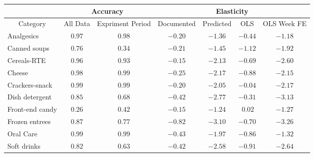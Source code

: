 {\small
\begin{center}
\begin{tabular}{l|cc|cccc}
\hline\hline
\multicolumn{1}{c|}{}&\multicolumn{2}{c|}{Accuracy}&\multicolumn{4}{c}{Elasticity}\tabularnewline
\hline
\multicolumn{1}{c}{Category}&\multicolumn{1}{c}{All Data}&\multicolumn{1}{c}{Expriment Period}&\multicolumn{1}{c}{Documented}&\multicolumn{1}{c}{Predicted}&\multicolumn{1}{c}{OLS}&\multicolumn{1}{c}{OLS Week FE}\tabularnewline
\hline
Analgesics&$0.97$&$0.98$&$-0.20$&$-1.36$&$-0.44$&$-1.18$\tabularnewline
Canned soups&$0.76$&$0.34$&$-0.21$&$-1.45$&$-1.12$&$-1.92$\tabularnewline
Cereals-RTE&$0.96$&$0.93$&$-0.15$&$-2.13$&$-0.69$&$-2.60$\tabularnewline
Cheese&$0.98$&$0.99$&$-0.25$&$-2.17$&$-0.88$&$-2.15$\tabularnewline
Crackers-snack&$0.99$&$0.99$&$-0.20$&$-2.05$&$-0.04$&$-2.17$\tabularnewline
Dish detergent&$0.85$&$0.68$&$-0.42$&$-2.77$&$-0.31$&$-3.13$\tabularnewline
Front-end candy&$0.26$&$0.42$&$-0.15$&$-1.24$&$~0.02$&$-1.27$\tabularnewline
Frozen entrees&$0.87$&$0.77$&$-0.82$&$-3.10$&$-0.70$&$-3.26$\tabularnewline
Oral Care&$0.99$&$0.99$&$-0.43$&$-1.97$&$-0.86$&$-1.32$\tabularnewline
Soft drinks&$0.82$&$0.63$&$-0.42$&$-2.58$&$-0.91$&$-2.64$\tabularnewline
\hline
\end{tabular}\end{center}}
